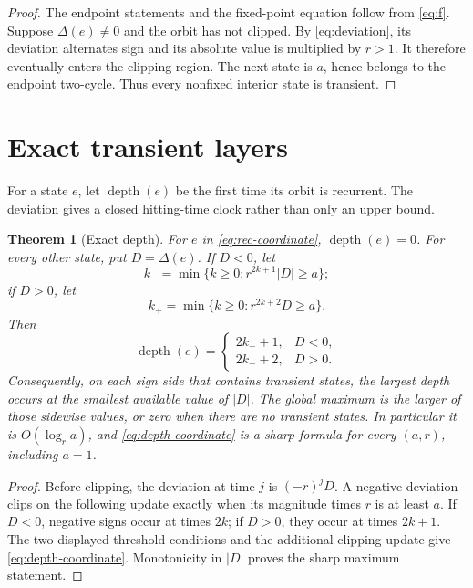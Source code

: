 \documentclass[11pt,a4paper]{amsart}
\newcommand{\depth}{\operatorname{depth}}
\newtheorem{theorem}{Theorem}[section]
\begin{document}
\begin{proof}
The endpoint statements and the fixed-point equation follow from
\eqref{eq:f}.  Suppose $\Delta(e)\neq0$ and the orbit has not clipped.  By
\eqref{eq:deviation}, its deviation alternates sign and its absolute value is
multiplied by $r>1$.  It therefore eventually enters the clipping region.
The next state is $a$, hence belongs to the endpoint two-cycle.  Thus every
nonfixed interior state is transient.
\end{proof}

\section{Exact transient layers}

For a state $e$, let $\depth(e)$ be the first time its orbit is recurrent.
The deviation gives a closed hitting-time clock rather than only an upper
bound.

\begin{theorem}[Exact depth]
\label{thm:depth-coordinate}
For $e$ in \eqref{eq:rec-coordinate}, $\depth(e)=0$.  For every other state,
put $D=\Delta(e)$.  If $D<0$, let
\[
 k_- =\min\{k\geq0:r^{2k+1}|D|\geq a\};
\]
if $D>0$, let
\[
 k_+ =\min\{k\geq0:r^{2k+2}D\geq a\}.
\]
Then
\begin{equation}
 \label{eq:depth-coordinate}
 \depth(e)=
 \begin{cases}
  2k_-+1,&D<0,\\
  2k_++2,&D>0.
 \end{cases}
\end{equation}
Consequently, on each sign side that contains transient states, the largest
depth occurs at the smallest available value of $|D|$.  The global maximum
is the larger of those sidewise values, or zero when there are no transient
states.  In particular it is $O(\log_r a)$, and
\eqref{eq:depth-coordinate} is a sharp formula for every $(a,r)$, including
$a=1$.
\end{theorem}

\begin{proof}
Before clipping, the deviation at time $j$ is $(-r)^jD$.  A negative
deviation clips on the following update exactly when its magnitude times
$r$ is at least $a$.  If $D<0$, negative signs occur at times $2k$; if
$D>0$, they occur at times $2k+1$.  The two displayed threshold conditions
and the additional clipping update give \eqref{eq:depth-coordinate}.
Monotonicity in $|D|$ proves the sharp maximum statement.
\end{proof}
\end{document}
